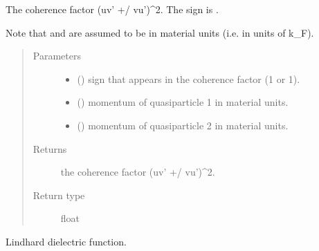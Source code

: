 \documentclass[letterpaper,10pt,english]{sphinxmanual}
\begin{document}
\begin{fulllineitems}

\begin{fulllineitems}
\label{\detokenize{code_structure:scdc.material.Material.coherence_uvvu}}
The coherence factor (uv’ +/\sphinxhyphen{} vu’)\textasciicircum{}2. The sign is .

Note that  and  are assumed to be in material units (i.e. in
units of k\_F).
\begin{quote}\begin{description}
\item[{Parameters}] \leavevmode\begin{itemize}
\item {} 
 () \textendash{} sign that appears in the coherence factor (1 or \sphinxhyphen{}1).

\item {} 
 () \textendash{} momentum of quasiparticle 1 in material units.

\item {} 
 () \textendash{} momentum of quasiparticle 2 in material units.

\end{itemize}

\item[{Returns}] \leavevmode
the coherence factor (uv’ +/\sphinxhyphen{} vu’)\textasciicircum{}2.

\item[{Return type}] \leavevmode
float

\end{description}\end{quote}

\end{fulllineitems}


\begin{fulllineitems}
\label{\detokenize{code_structure:scdc.material.Material.epsilon_lindhard}}
Lindhard dielectric function.


\end{fulllineitems}
\end{fulllineitems}
\end{document}
